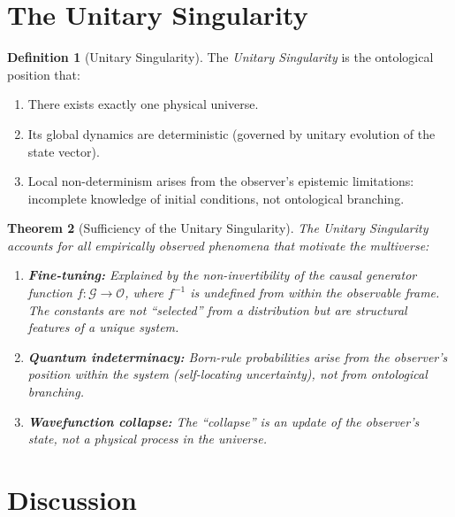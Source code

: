 \documentclass[12pt, a4paper]{article}
\theoremstyle{plain}
\newtheorem{theorem}{Theorem}[section]
\theoremstyle{definition}
\newtheorem{definition}[theorem]{Definition}
\theoremstyle{remark}
\begin{document}
\section{The Unitary Singularity}\label{sec:unitary}

\begin{definition}[Unitary Singularity]\label{def:unitary}
  The \emph{Unitary Singularity} is the ontological position that:
  \begin{enumerate}[label=(\roman*)]
    \item There exists exactly one physical universe.
    \item Its global dynamics are deterministic (governed by unitary
      evolution of the state vector).
    \item Local non-determinism arises from the observer's epistemic
      limitations: incomplete knowledge of initial conditions, not
      ontological branching.
  \end{enumerate}
\end{definition}

\begin{theorem}[Sufficiency of the Unitary Singularity]\label{thm:sufficiency}
  The Unitary Singularity accounts for all empirically observed phenomena
  that motivate the multiverse:
  \begin{enumerate}[label=(\alph*)]
    \item \textbf{Fine-tuning:} Explained by the non-invertibility of the
      causal generator function $f: \mathcal{G} \to \mathcal{O}$, where
      $f^{-1}$ is undefined from within the observable frame. The
      constants are not ``selected'' from a distribution but are
      structural features of a unique system.
    \item \textbf{Quantum indeterminacy:} Born-rule probabilities arise
      from the observer's position within the system (self-locating
      uncertainty), not from ontological branching.
    \item \textbf{Wavefunction collapse:} The ``collapse'' is an update
      of the observer's state, not a physical process in the universe.
  \end{enumerate}
\end{theorem}

\section{Discussion}\label{sec:discussion}
\end{document}
